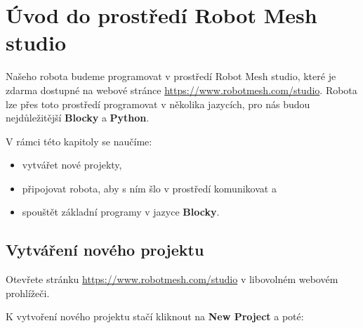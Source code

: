 \documentclass[../main.tex]{subfiles}
\begin{document}
	\section{Úvod do prostředí Robot Mesh studio}

	Našeho robota budeme programovat v prostředí Robot Mesh studio, které je zdarma dostupné na webové stránce \href{https://www.robotmesh.com/studio}{https://www.robotmesh.com/studio}. Robota lze přes toto prostředí programovat v několika jazycích, pro nás budou nejdůležitější \textbf{Blocky} a \textbf{Python}.

	V rámci této kapitoly se naučíme:
	\begin{itemize}
		\item vytvářet nové projekty,
		\item připojovat robota, aby s ním šlo v prostředí komunikovat a
		\item spouštět základní programy v jazyce \textbf{Blocky}.
	\end{itemize}

	\subsection{Vytváření nového projektu}

	Otevřete stránku \href{https://www.robotmesh.com/studio}{https://www.robotmesh.com/studio} v libovolném webovém prohlížeči.

	\begin{figure}[h!]
		\centering
	\end{figure}

	K vytvoření nového projektu stačí kliknout na \textbf{New Project} a poté:
\end{document}
